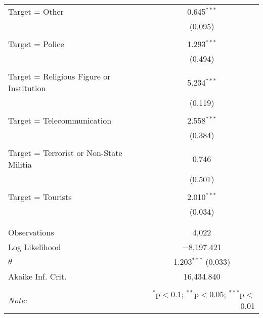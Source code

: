 \begin{table}[!htbp]
\begin{tabular}{@{\extracolsep{5pt}}lc}
 Target = Other & 0.645$^{***}$ \\ 
  & (0.095) \\ 
  & \\ 
 Target = Police & 1.293$^{***}$ \\ 
  & (0.494) \\ 
  & \\ 
 Target = Religious Figure or Institution & 5.234$^{***}$ \\ 
  & (0.119) \\ 
  & \\ 
 Target = Telecommunication & 2.558$^{***}$ \\ 
  & (0.384) \\ 
  & \\ 
 Target = Terrorist or Non-State Militia & 0.746 \\ 
  & (0.501) \\ 
  & \\ 
 Target = Tourists & 2.010$^{***}$ \\ 
  & (0.034) \\ 
  & \\ 
\hline \\[-1.8ex] 
Observations & 4,022 \\ 
Log Likelihood & $-$8,197.421 \\ 
$\theta$ & 1.203$^{***}$  (0.033) \\ 
Akaike Inf. Crit. & 16,434.840 \\ 
\hline 
\hline \\[-1.8ex] 
\textit{Note:}  & \multicolumn{1}{r}{$^{*}$p$<$0.1; $^{**}$p$<$0.05; $^{***}$p$<$0.01} \\ 
\end{tabular} 
\end{table} 
